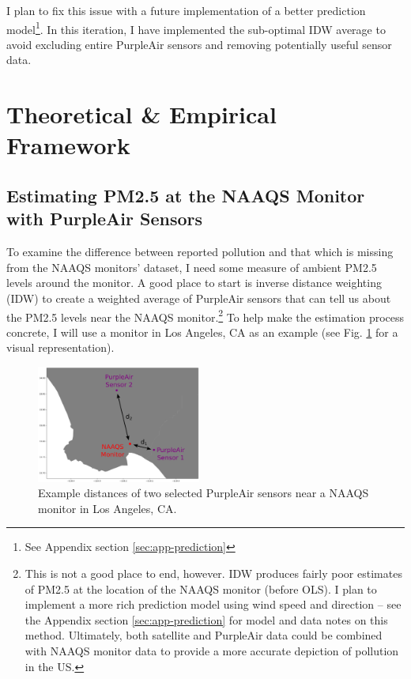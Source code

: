 \documentclass[12pt]{article}
\begin{document}
I plan to fix this issue with a future implementation of a better prediction model\footnote{See Appendix section \ref{sec:app-prediction}}. In this iteration, I have implemented the sub-optimal IDW average to avoid excluding entire PurpleAir sensors and removing potentially useful sensor data.









\section{Theoretical \& Empirical Framework} 
\label{theoretical}

\subsection{Estimating PM2.5 at the NAAQS Monitor with PurpleAir Sensors}
\FloatBarrier

To examine the difference between reported pollution and that which is missing from the NAAQS monitors' dataset, I need some measure of ambient PM2.5 levels around the monitor. A good place to start is inverse distance weighting (IDW) to create a weighted average of PurpleAir sensors that can tell us about the PM2.5 levels near the NAAQS monitor.\footnote{This is not a good place to end, however. IDW produces fairly poor estimates of PM2.5 at the location of the NAAQS monitor (before OLS). I plan to implement a more rich prediction model using wind speed and direction -- see the Appendix section \ref{sec:app-prediction} for model and data notes on this method. Ultimately, both satellite and PurpleAir data could be combined with NAAQS monitor data to provide a more accurate depiction of pollution in the US.} To help make the estimation process concrete, I will use a monitor in Los Angeles, CA as an example (see Fig. \ref{fig:idw_diagram} for a visual representation).

\begin{figure}
  \begin{center}
    \includegraphics[width=0.48\textwidth]{IDW_diagram}
  \end{center}
  \caption{Example distances of two selected PurpleAir sensors near a NAAQS monitor in Los Angeles, CA.}
  \label{fig:idw_diagram}
\end{figure}
\end{document}
